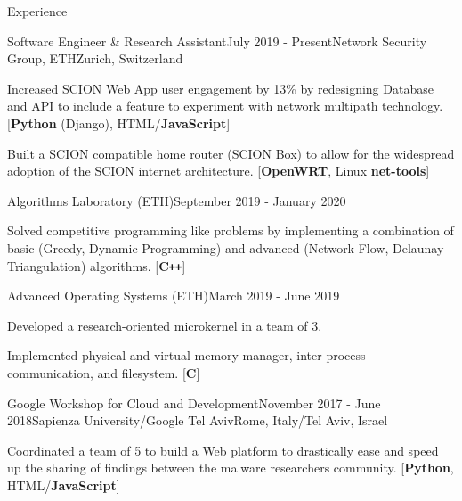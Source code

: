 \documentclass{resume}
\begin{document}
\begin{rSection}{Experience}

  \begin{rSubsection}{Software Engineer \& Research Assistant}{July 2019 - Present}{Network Security Group, ETH}{Zurich, Switzerland}
  \item Increased SCION Web App user engagement by 13\% by redesigning Database and API to include a feature to experiment with network multipath technology.  [\textbf{Python} (Django), HTML/\textbf{JavaScript}]
  \item Built a SCION compatible home router (SCION Box) to allow for the widespread adoption of the SCION internet architecture. [\textbf{OpenWRT}, Linux \textbf{net-tools}]
  \end{rSubsection}
  \begin{rSubsection}{Algorithms Laboratory (ETH)}{September 2019 - January 2020}{}{}
  \item Solved competitive programming like problems by implementing a combination of basic (Greedy, Dynamic Programming) and advanced (Network Flow, Delaunay Triangulation) algorithms. [\textbf{C\texttt{++}}]
  \end{rSubsection}
  \begin{rSubsection}{Advanced Operating Systems (ETH)}{March 2019 - June 2019}{}{}
  \item Developed a research-oriented microkernel in a team of 3.
  \item Implemented physical and virtual memory manager, inter-process communication, and filesystem. [\textbf{C}]
  \end{rSubsection}
  \begin{rSubsection}{Google Workshop for Cloud and Development}{November 2017 - June 2018}{Sapienza University/Google Tel Aviv}{Rome, Italy/Tel Aviv, Israel}
  \item Coordinated a team of 5 to build a Web platform to drastically ease and speed up the sharing of findings between the malware researchers community. [\textbf{Python}, HTML/\textbf{JavaScript}]
  \end{rSubsection}

\end{rSection}

\end{document}
